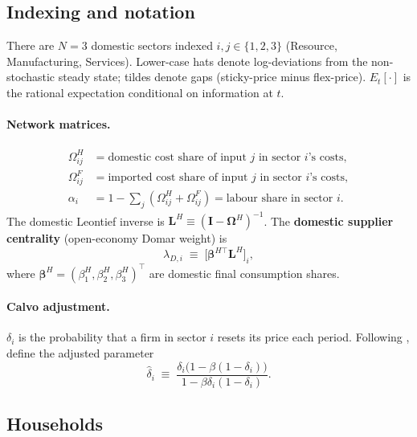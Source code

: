 \documentclass[11pt,a4paper]{article}
\newcommand{\OmH}{\bm\Omega^{H}}
\newcommand{\wh}[1]{\widehat{#1}}
\begin{document}
\subsection{Indexing and notation}

There are $N=3$ domestic sectors indexed $i,j\in\{1,2,3\}$
(Resource, Manufacturing, Services).
Lower-case hats denote log-deviations from the non-stochastic steady state;
tildes denote gaps (sticky-price minus flex-price).
$E_t[\cdot]$ is the rational expectation conditional on information at $t$.

\paragraph{Network matrices.}
\begin{align*}
\Omega^H_{ij}&=\text{domestic cost share of input }j\text{ in sector }i\text{'s costs},\\
\Omega^F_{ij}&=\text{imported cost share of input }j\text{ in sector }i\text{'s costs},\\
\alpha_i&=1-\sum_j(\Omega^H_{ij}+\Omega^F_{ij})=\text{labour share in sector }i.
\end{align*}
The domestic Leontief inverse is $\mathbf{L}^H\equiv(\mathbf{I}-\OmH)^{-1}$.
The \textbf{domestic supplier centrality} (open-economy Domar weight) is
\begin{equation}
\lambda_{D,i}\;\equiv\;\bigl[\bm\beta^{H\top}\mathbf{L}^H\bigr]_i,
\label{eq:lambdaD}
\end{equation}
where $\bm\beta^H=(\beta^H_1,\beta^H_2,\beta^H_3)^{\top}$ are domestic final
consumption shares.

\paragraph{Calvo adjustment.}
$\delta_i$ is the probability that a firm in sector $i$ resets its price each period.
Following \citet{Rubbo2024}, define the adjusted parameter
\begin{equation}
\wh\delta_i\;\equiv\;\frac{\delta_i\bigl(1-\beta(1-\delta_i)\bigr)}{1-\beta\delta_i(1-\delta_i)}.
\label{eq:deltahat}
\end{equation}

\subsection{Households}
\end{document}
